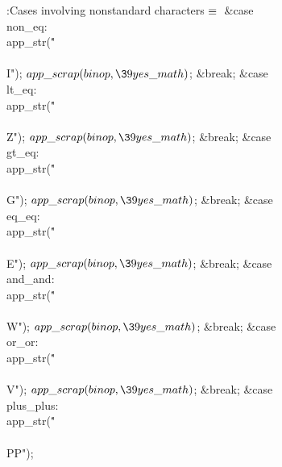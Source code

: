 \Y\B\4:Cases involving nonstandard characters\X${}\equiv{}$\6
\4\hbox{\1\quad}\&{case} \\{non\_eq}:\5
\\{app\_str}(\.{"\\\\I"});\5
${}\\{app\_scrap}(\\{binop},\39\\{yes\_math}){}$;\5
\&{break};\6
\4\&{case} \\{lt\_eq}:\5
\\{app\_str}(\.{"\\\\Z"});\5
${}\\{app\_scrap}(\\{binop},\39\\{yes\_math}){}$;\5
\&{break};\6
\4\&{case} \\{gt\_eq}:\5
\\{app\_str}(\.{"\\\\G"});\5
${}\\{app\_scrap}(\\{binop},\39\\{yes\_math}){}$;\5
\&{break};\6
\4\&{case} \\{eq\_eq}:\5
\\{app\_str}(\.{"\\\\E"});\5
${}\\{app\_scrap}(\\{binop},\39\\{yes\_math}){}$;\5
\&{break};\6
\4\&{case} \\{and\_and}:\5
\\{app\_str}(\.{"\\\\W"});\5
${}\\{app\_scrap}(\\{binop},\39\\{yes\_math}){}$;\5
\&{break};\6
\4\&{case} \\{or\_or}:\5
\\{app\_str}(\.{"\\\\V"});\5
${}\\{app\_scrap}(\\{binop},\39\\{yes\_math}){}$;\5
\&{break};\6
\4\&{case} \\{plus\_plus}:\5
\\{app\_str}(\.{"\\\\PP"});\5
